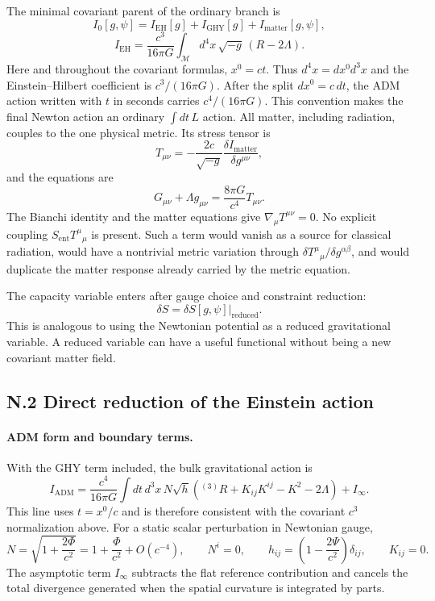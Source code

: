 \documentclass[11pt]{article}
\begin{document}
The minimal covariant parent of the ordinary branch is
\[
I_0[g,\psi]
=I_{\mathrm{EH}}[g]+I_{\mathrm{GHY}}[g]
+I_{\mathrm{matter}}[g,\psi],
\]
\[
I_{\mathrm{EH}}
=\frac{c^3}{16\pi G}
\int_{\mathcal M}d^4x\,\sqrt{-g}\,(R-2\Lambda).
\]
Here and throughout the covariant formulas, $x^0=ct$. Thus $d^4x=dx^0d^3x$ and the Einstein--Hilbert coefficient is $c^3/(16\pi G)$. After the split $dx^0=c\,dt$, the ADM action written with $t$ in seconds carries $c^4/(16\pi G)$. This convention makes the final Newton action an ordinary $\int dt\,L$ action.
All matter, including radiation, couples to the one physical metric. Its stress tensor is
\[
T_{\mu\nu}
=-\frac{2c}{\sqrt{-g}}
\frac{\delta I_{\mathrm{matter}}}{\delta g^{\mu\nu}},
\]
and the equations are
\[
G_{\mu\nu}+\Lambda g_{\mu\nu}
=\frac{8\pi G}{c^4}T_{\mu\nu}.
\]
The Bianchi identity and the matter equations give $\nabla_\mu T^{\mu\nu}=0$. No explicit coupling $S_{\mathrm{ent}}T^\mu{}_\mu$ is present. Such a term would vanish as a source for classical radiation, would have a nontrivial metric variation through $\delta T^\mu{}_\mu/\delta g^{\alpha\beta}$, and would duplicate the matter response already carried by the metric equation.

The capacity variable enters after gauge choice and constraint reduction:
\[
\delta S=\delta S[g,\psi]\big|_{\mathrm{reduced}}.
\]
This is analogous to using the Newtonian potential as a reduced gravitational variable. A reduced variable can have a useful functional without being a new covariant matter field.

\subsection*{N.2 Direct reduction of the Einstein action}

\paragraph{ADM form and boundary terms.}
With the GHY term included, the bulk gravitational action is
\[
I_{\mathrm{ADM}}
=\frac{c^4}{16\pi G}
\int dt\,d^3x\,N\sqrt h
\left({}^{(3)}R+K_{ij}K^{ij}-K^2-2\Lambda\right)
+I_\infty.
\]
This line uses $t=x^0/c$ and is therefore consistent with the covariant $c^3$ normalization above.
For a static scalar perturbation in Newtonian gauge,
\[
N=\sqrt{1+\frac{2\Phi}{c^2}}
=1+\frac{\Phi}{c^2}+O(c^{-4}),
\qquad
N^i=0,
\qquad
h_{ij}=\left(1-\frac{2\Psi}{c^2}\right)\delta_{ij},
\qquad
K_{ij}=0.
\]
The asymptotic term $I_\infty$ subtracts the flat reference contribution and cancels the total divergence generated when the spatial curvature is integrated by parts.
\end{document}
